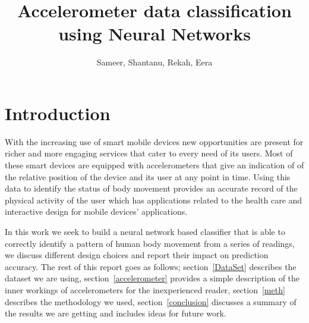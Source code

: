 \documentclass{article}
\title{Accelerometer data classification using Neural Networks}
\author{ Sameer, Shantanu, Rekah, Eera}
\date{}
\begin{document}
\maketitle


\pagebreak
\tableofcontents

\pagebreak
\listoffigures

\pagebreak
\listoftables

\pagebreak

%
%
\section{Introduction}
\label{introduction}

With the increasing use of smart mobile devices new opportunities are present for richer and more engaging services 
that cater to every need of its users. Most of these smart devices are equipped with accelerometers that give an
indication of of the relative position of the device and its user at any point in time. Using this data to identify the 
status of body movement provides an accurate record of the physical activity of the user which has applications related 
to the health care and interactive design for mobile devices' applications. 

In this work we seek to build a neural network based classifier that is able to correctly identify a pattern of human body 
movement from a series of readings, we discuss different design choices and report their impact on prediction accuracy. The 
rest of this report goes as follows; section~\ref{DataSet} describes the dataset we are using, section~\ref{accelerometer} 
provides a simple description of the inner workings of accelerometers for the inexperienced reader, section~\ref{meth} describes 
the methodology we used, section~\ref{conclusion} discusses a summary of the results we are getting and includes ideas for future work.
\end{document}
